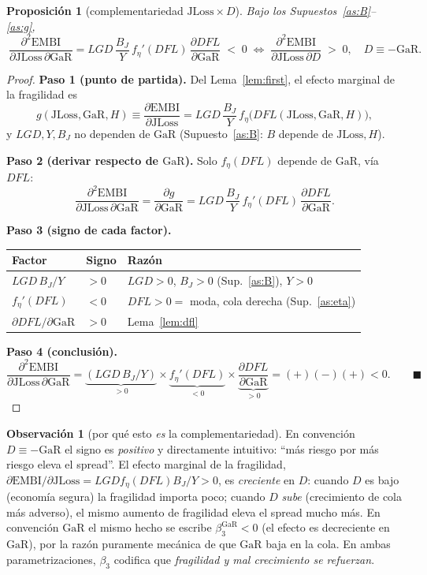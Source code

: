 \documentclass[11pt]{article}
\theoremstyle{plain}
\newtheorem{proposition}{Proposición}
\theoremstyle{definition}
\newtheorem{remark}{Observación}
\newcommand{\JLoss}{\mathrm{JLoss}}
\newcommand{\EMBI}{\mathrm{EMBI}}
\newcommand{\GaR}{\mathrm{GaR}}
\newcommand{\1}{\mathbf{1}}
\begin{document}
\begin{proposition}[complementariedad $\JLoss\times D$]\label{prop:cross}
Bajo los Supuestos~\ref{as:B}--\ref{as:g},
\[
\boxed{\ \frac{\partial^2 \EMBI}{\partial \JLoss\,\partial \GaR}=LGD\,\frac{B_J}{Y}\,f_\eta'(DFL)\,\frac{\partial DFL}{\partial \GaR}\;<\;0
\;\Longleftrightarrow\;
\frac{\partial^2 \EMBI}{\partial \JLoss\,\partial D}\;>\;0,\quad D\equiv-\GaR.\ }
\]
\end{proposition}
\begin{proof}
\textbf{Paso 1 (punto de partida).} Del Lema~\ref{lem:first}, el efecto marginal de la fragilidad es
\[
g(\JLoss,\GaR,H)\equiv\frac{\partial \EMBI}{\partial \JLoss}=LGD\,\frac{B_J}{Y}\,f_\eta\big(DFL(\JLoss,\GaR,H)\big),
\]
y $LGD,Y,B_J$ no dependen de $\GaR$ (Supuesto~\ref{as:B}: $B$ depende de $\JLoss,H$).

\textbf{Paso 2 (derivar respecto de $\GaR$).} Solo $f_\eta(DFL)$ depende de $\GaR$, vía $DFL$:
\[
\frac{\partial^2 \EMBI}{\partial \JLoss\,\partial \GaR}=\frac{\partial g}{\partial \GaR}=LGD\,\frac{B_J}{Y}\,f_\eta'(DFL)\,\frac{\partial DFL}{\partial \GaR}.
\]

\textbf{Paso 3 (signo de cada factor).}
\begin{center}
\begin{tabular}{lll}
\toprule
Factor & Signo & Razón \\
\midrule
$LGD\,B_J/Y$ & $>0$ & $LGD>0$, $B_J>0$ (Sup.~\ref{as:B}), $Y>0$ \\
$f_\eta'(DFL)$ & $<0$ & $DFL>0=$ moda, cola derecha (Sup.~\ref{as:eta}) \\
$\partial DFL/\partial \GaR$ & $>0$ & Lema~\ref{lem:dfl} \\
\bottomrule
\end{tabular}
\end{center}

\textbf{Paso 4 (conclusión).}
\[
\frac{\partial^2 \EMBI}{\partial \JLoss\,\partial \GaR}=\underbrace{(LGD\,B_J/Y)}_{>0}\times\underbrace{f_\eta'(DFL)}_{<0}\times\underbrace{\frac{\partial DFL}{\partial \GaR}}_{>0}=(+)(-)(+)<0. \qquad\blacksquare
\]
\end{proof}

\begin{remark}[por qué esto \emph{es} la complementariedad]
En convención $D\equiv-\GaR$ el signo es \emph{positivo} y directamente intuitivo: ``más riesgo por más riesgo eleva el spread''. El efecto marginal de la fragilidad, $\partial\EMBI/\partial\JLoss=LGD f_\eta(DFL)B_J/Y>0$, es \emph{creciente} en $D$: cuando $D$ es bajo (economía segura) la fragilidad importa poco; cuando $D$ \emph{sube} (crecimiento de cola más adverso), el mismo aumento de fragilidad eleva el spread mucho más. En convención $\GaR$ el mismo hecho se escribe $\beta_3^{\GaR}<0$ (el efecto es decreciente en $\GaR$), por la razón puramente mecánica de que $\GaR$ baja en la cola. En ambas parametrizaciones, $\beta_3$ codifica que \emph{fragilidad y mal crecimiento se refuerzan}.
\end{remark}
\end{document}

